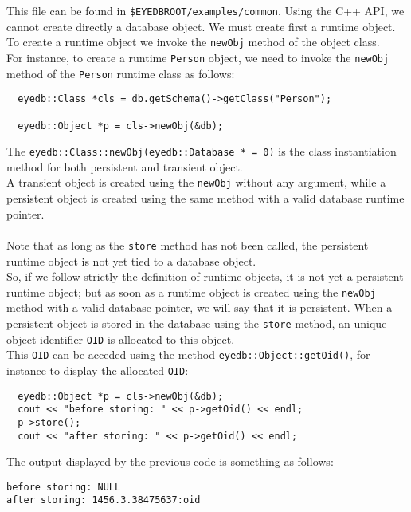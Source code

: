 \normalsize
This file can be found in \texttt{\$EYEDBROOT/examples/common}.
Using the C++ API, we cannot create directly a database object.
We must create first a runtime object.
\\
To create a runtime object we invoke the \texttt{newObj} method
of the object class.
\\
For instance, to create a runtime \texttt{Person} object, we need
to invoke the \texttt{newObj} method of the \texttt{Person} runtime class
as follows:
\verbsize
\begin{verbatim}
  eyedb::Class *cls = db.getSchema()->getClass("Person");

  eyedb::Object *p = cls->newObj(&db);
\end{verbatim}
\normalsize
The \texttt{eyedb::Class::newObj(eyedb::Database * = 0)} is the class instantiation
method for both persistent and transient object.
\\
A transient object is created using the \texttt{newObj} without any argument,
while a persistent object is created using the same method with
a valid database runtime pointer.
\\
\\
Note that as long as the \texttt{store} method has not been called,
the persistent runtime object is not yet tied to a database object.
\\
So, if we follow strictly the definition of runtime objects,
it is not yet a persistent runtime object; but as soon as a runtime
object is created using the \texttt{newObj} method with a valid database
pointer, we will say that it is persistent.
When a persistent object is stored in the database using the
\texttt{store} method, an unique object identifier \texttt{OID} is allocated
to this object.
\\
This \texttt{OID} can be acceded using the method \texttt{eyedb::Object::getOid()},
for instance to display the allocated \texttt{OID}:
\verbsize
\begin{verbatim}
  eyedb::Object *p = cls->newObj(&db);
  cout << "before storing: " << p->getOid() << endl;
  p->store();
  cout << "after storing: " << p->getOid() << endl;
\end{verbatim}
\normalsize
The output displayed by the previous code is something as follows:
\verbsize
\begin{verbatim}
before storing: NULL
after storing: 1456.3.38475637:oid
\end{verbatim}
